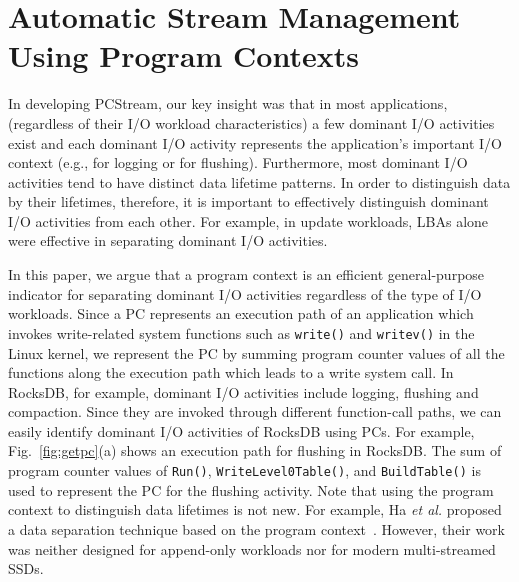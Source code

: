 \section{Automatic Stream Management Using Program Contexts}

In developing \textsf{\small PCStream}, our key insight was that in most applications,
(regardless of their I/O workload characteristics)
a few dominant I/O activities exist
and each dominant I/O activity   
represents the application's important I/O context (e.g., for logging or for flushing). 
Furthermore, most dominant I/O activities tend to have distinct data lifetime patterns.
In order to distinguish data by their lifetimes, therefore, 
it is important to effectively distinguish dominant I/O activities from each other.  
For example, in update workloads, 
LBAs alone were effective in separating dominant I/O activities.  

In this paper, we argue that a program context is an efficient general-purpose
indicator for separating dominant I/O activities regardless of the type of I/O
workloads.  Since a PC represents an execution path of an application which
invokes write-related system functions such as {\tt write()} and {\tt writev()}
in the Linux kernel,  we represent the PC by summing program counter values of
all the functions along the execution path which leads to a write system call.
In RocksDB, for example, dominant I/O activities include logging, flushing and
compaction.  Since they are invoked through different function-call paths, we
can easily identify dominant I/O activities of RocksDB using PCs.  For example,
Fig.~\ref{fig:getpc}(a) shows an execution path for flushing in RocksDB.  The
sum of program counter values of \texttt{Run()}, \texttt{WriteLevel0Table()},
and \texttt{BuildTable()} is used to represent the PC for the flushing
activity. Note that using the program context to distinguish data lifetimes is
not new. For example, Ha {\it et al.} proposed a data separation technique
based on the program context~\cite{PCHa}.  However, their work was neither
designed for append-only workloads nor for modern multi-streamed SSDs.

